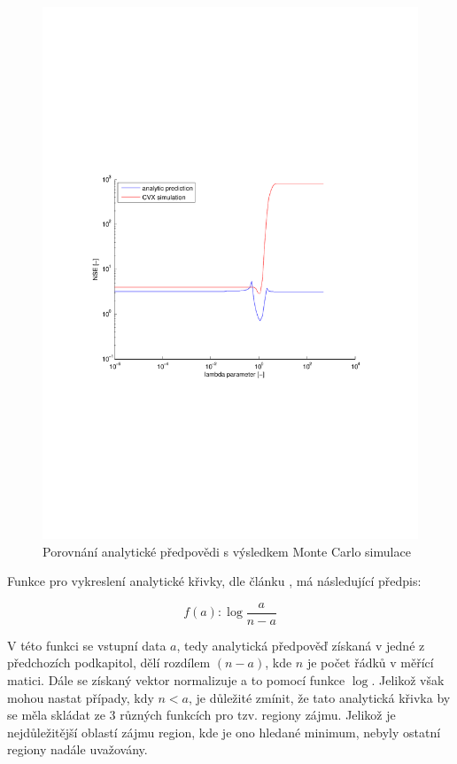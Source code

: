 \documentclass[FM,BP]{tulthesis}
\newcounter{Vzorce}
\begin{document}
\begin{figure}[!ht]
	\begin{center}
		\includegraphics[scale=0.7]{obr/analytic.pdf}
	\end{center}
	\caption{Porovnání analytické předpovědi s výsledkem Monte Carlo simulace}
	\label{fig:analytic}
\end{figure}

Funkce pro vykreslení analytické křivky, dle článku \cite{hassibiClanek}, má následující předpis:

\begin{equation} \label{eq:analytic}  \tag{Vzorec \theVzorce}
f(a) : \log \frac{a}{n - a}
\end{equation}

V této funkci se vstupní data $a$, tedy analytická předpověď získaná v jedné z předchozích podkapitol, dělí rozdílem $(n-a)$, kde $n$ je počet řádků v měřící matici. Dále se získaný vektor normalizuje a to pomocí funkce $\log$. Jelikož však mohou nastat případy, kdy $n < a$, je důležité zmínit, že tato analytická křivka by se měla skládat ze 3 různých funkcích pro tzv. regiony zájmu. Jelikož je nejdůležitější oblastí zájmu region, kde je ono hledané minimum, nebyly ostatní regiony nadále uvažovány. 
\end{document}
